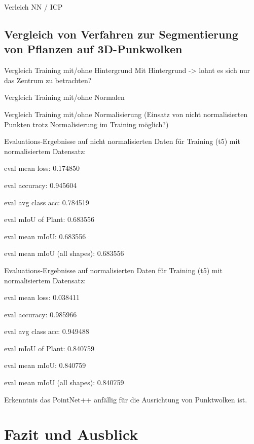 \documentclass[12pt,titlepage, twoside]{article}
\begin{document}
Verleich NN / ICP

\subsection{Vergleich von Verfahren zur Segmentierung von Pflanzen auf 3D-Punkwolken}

Vergleich Training mit/ohne Hintergrund
    Mit Hintergrund -> lohnt es sich nur das Zentrum zu betrachten?

Vergleich Training mit/ohne Normalen

Vergleich Training mit/ohne Normalisierung (Einsatz von nicht normalisierten Punkten trotz Normalisierung im Training möglich?)

Evaluations-Ergebnisse auf nicht normalisierten Daten für Training (t5) mit normalisiertem Datensatz:

eval mean loss: 0.174850

eval accuracy: 0.945604

eval avg class acc: 0.784519

eval mIoU of Plant:	 0.683556

eval mean mIoU: 0.683556

eval mean mIoU (all shapes): 0.683556



Evaluations-Ergebnisse auf normalisierten Daten für Training (t5) mit normalisiertem Datensatz:

eval mean loss: 0.038411

eval accuracy: 0.985966

eval avg class acc: 0.949488

eval mIoU of Plant:	 0.840759

eval mean mIoU: 0.840759

eval mean mIoU (all shapes): 0.840759



Erkenntnis das PointNet++ anfällig für die Ausrichtung von Punktwolken ist. 

\newpage
\section{Fazit und Ausblick}
\label{sec:fazit}
%
\end{document}
